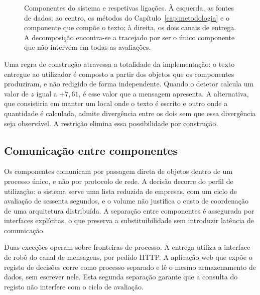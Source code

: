 \begin{figure}[htbp]
\caption[Arquitetura do InvestiGator]{Componentes do sistema e respetivas ligações. À esquerda, as
fontes de dados; ao centro, os métodos do Capítulo~\ref{cap:metodologia} e o componente que compõe
o texto; à direita, os dois canais de entrega. A decomposição encontra-se a tracejado por ser o
único componente que não intervém em todas as avaliações.}
\label{fig:sis_arquitetura}
\end{figure}

Uma regra de construção atravessa a totalidade da implementação: o texto entregue ao utilizador é
composto a partir dos objetos que os componentes produziram, e não redigido de forma independente.
Quando o detetor calcula um valor de $z$ igual a $+7{,}61$, é esse valor que a mensagem apresenta.
A alternativa, que consistiria em manter um local onde o texto é escrito e outro onde a quantidade
é calculada, admite divergência entre os dois sem que essa divergência seja observável. A
restrição elimina essa possibilidade por construção.

\subsection{Comunicação entre componentes}

Os componentes comunicam por passagem direta de objetos dentro de um processo único, e não por
protocolo de rede. A decisão decorre do perfil de utilização: o sistema serve uma lista reduzida
de empresas, com um ciclo de avaliação de sessenta segundos, e o volume não justifica o custo de
coordenação de uma arquitetura distribuída. A separação entre componentes é assegurada por
interfaces explícitas, o que preserva a substituibilidade sem introduzir latência de comunicação.

Duas exceções operam sobre fronteiras de processo. A entrega utiliza a interface de robô do canal
de mensagens, por pedido \gls{HTTP}. A aplicação web que expõe o registo de decisões corre como processo
separado e lê o mesmo armazenamento de dados, sem escrever nele. Esta segunda separação garante que
a consulta do registo não interfere com o ciclo de avaliação.

